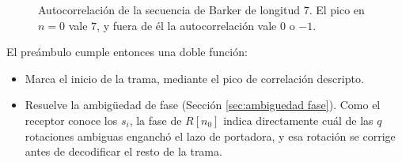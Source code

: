 \begin{figure}
    \begin{center}
    \end{center}
    \caption{Autocorrelación de la secuencia de Barker de longitud $7$. El pico en $n=0$ vale $7$, y fuera de él la autocorrelación vale $0$ o $-1$.}\label{fig:barker}
\end{figure}

El preámbulo cumple entonces una doble función:
\begin{itemize}
    \item Marca el inicio de la trama, mediante el pico de correlación descripto.
    \item Resuelve la ambigüedad de fase (Sección \ref{sec:ambiguedad fase}). Como el receptor conoce los $s_i$, la fase de $R[n_0]$ indica directamente cuál de las $q$ rotaciones ambiguas enganchó el lazo de portadora, y esa rotación se corrige antes de decodificar el resto de la trama.
\end{itemize}

